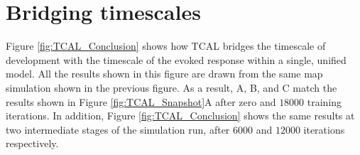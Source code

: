 \documentclass[phd,ianc,twoside]{infthesis}
\begin{document}
\section{Bridging timescales}
\label{section:bridging_timescales}

Figure \ref{fig:TCAL_Conclusion} shows how TCAL bridges the timescale of
development with the timescale of the evoked response within a single,
unified model. All the results shown in this figure are drawn from the
same map simulation shown in the previous figure. As a result, A, B, and C
match the results shown in Figure \ref{fig:TCAL_Snapshot}A after zero
and $18000$ training iterations.  In addition, Figure
\ref{fig:TCAL_Conclusion} shows the same results at two intermediate
stages of the simulation run, after $6000$ and $12000$ iterations
respectively.
\end{document}
